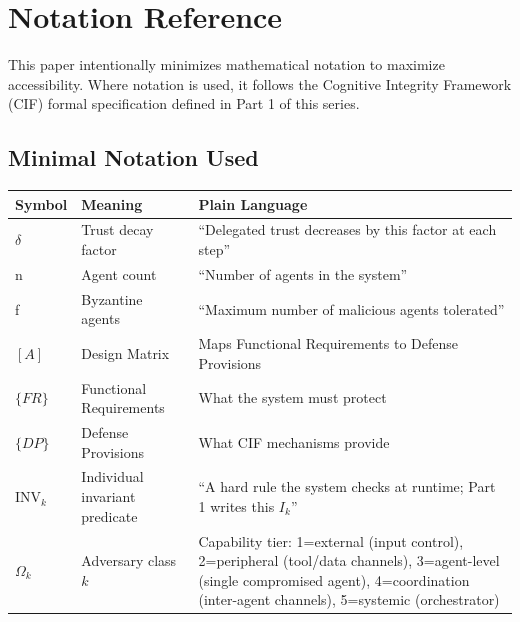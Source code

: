 \documentclass[
]{article}
\newcounter{none} %
\begin{document}
\section{Notation Reference}\label{sec:notation-reference}

This paper intentionally minimizes mathematical notation to maximize
accessibility. Where notation is used, it follows the Cognitive
Integrity Framework (CIF) formal specification defined in Part 1 of this
series.

\subsection{Minimal Notation Used}\label{minimal-notation-used}

{\def\LTcaptype{none} %
\begin{longtable}[]{@{}
  >{\raggedright\arraybackslash}p{}
  >{\raggedright\arraybackslash}p{}
  >{\raggedright\arraybackslash}p{}@{}}
\toprule\noalign{}
\begin{minipage}[b]{\linewidth}\raggedright
Symbol
\end{minipage} & \begin{minipage}[b]{\linewidth}\raggedright
Meaning
\end{minipage} & \begin{minipage}[b]{\linewidth}\raggedright
Plain Language
\end{minipage} \\
\midrule\noalign{}
\endhead
\bottomrule\noalign{}
\endlastfoot
\texorpdfstring{\ensuremath{\delta}}{delta} & Trust decay factor & ``Delegated trust decreases by this factor at
each step'' \\
n & Agent count & ``Number of agents in the system'' \\
f & Byzantine agents & ``Maximum number of malicious agents
tolerated'' \\
\([A]\) & Design Matrix & Maps Functional Requirements to Defense
Provisions \\
\(\{FR\}\) & Functional Requirements & What the system must protect \\
\(\{DP\}\) & Defense Provisions & What CIF mechanisms provide \\
\(\text{INV}_k\) & Individual invariant predicate & ``A hard rule the
system checks at runtime; Part 1 writes this \(I_k\)'' \\
\(\Omega_k\) & Adversary class \(k\) & Capability tier: 1=external
(input control), 2=peripheral (tool/data channels), 3=agent-level
(single compromised agent), 4=coordination (inter-agent channels),
5=systemic (orchestrator) \\
\end{longtable}
}
\end{document}
